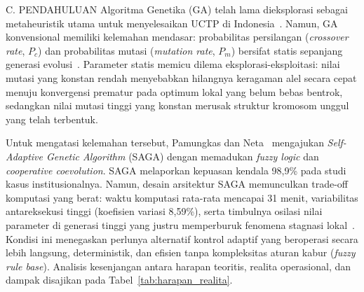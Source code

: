 \documentclass[letterpaper,12pt,oneside]{article}
\begin{document}
\begin{wordsection}{C. PENDAHULUAN}
Algoritma Genetika (GA) telah lama dieksplorasi sebagai metaheuristik utama untuk menyelesaikan UCTP di Indonesia~\cite{sari2019optimasi,kristiadi2019genetic,fachrie2021paralelisasi}. Namun, GA konvensional memiliki kelemahan mendasar: probabilitas persilangan (\textit{crossover rate}, $P_c$) dan probabilitas mutasi (\textit{mutation rate}, $P_m$) bersifat statis sepanjang generasi evolusi~\cite{eiben1999parameter,karafotias2015parameter}. Parameter statis memicu dilema eksplorasi-eksploitasi: nilai mutasi yang konstan rendah menyebabkan hilangnya keragaman alel secara cepat menuju konvergensi prematur pada optimum lokal yang belum bebas bentrok, sedangkan nilai mutasi tinggi yang konstan merusak struktur kromosom unggul yang telah terbentuk.

Untuk mengatasi kelemahan tersebut, Pamungkas dan Neta~\cite{pamungkas2025saga} mengajukan \textit{Self-Adaptive Genetic Algorithm} (SAGA) dengan memadukan \textit{fuzzy logic} dan \textit{cooperative coevolution}. SAGA melaporkan kepuasan kendala 98,9\% pada studi kasus institusionalnya. Namun, desain arsitektur SAGA memunculkan trade-off komputasi yang berat: waktu komputasi rata-rata mencapai 31 menit, variabilitas antareksekusi tinggi (koefisien variasi 8,59\%), serta timbulnya osilasi nilai parameter di generasi tinggi yang justru memperburuk fenomena stagnasi lokal~\cite{pamungkas2025saga}. Kondisi ini menegaskan perlunya alternatif kontrol adaptif yang beroperasi secara lebih langsung, deterministik, dan efisien tanpa kompleksitas aturan kabur (\textit{fuzzy rule base}). Analisis kesenjangan antara harapan teoritis, realita operasional, dan dampak disajikan pada Tabel~\ref{tab:harapan_realita}.


\end{wordsection}
\end{document}
